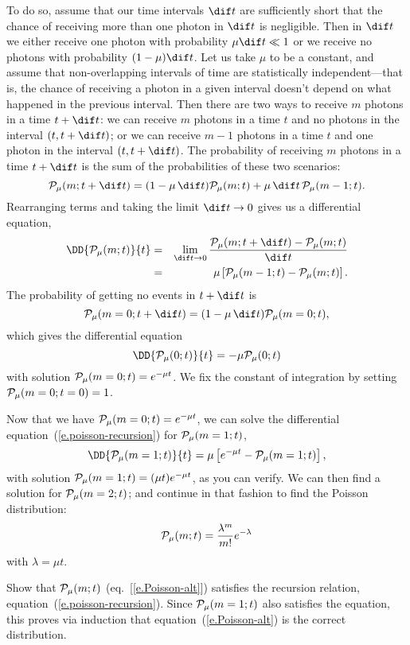 To do so, assume that our time intervals $\dif t$ are sufficiently short that the chance of receiving more than one photon in $\dif t$ is negligible.  Then in $\dif t$ we either receive one photon with probability $\mu\dif t \ll 1$ or we receive no photons with probability $(1-\mu)\dif t$.  Let us take $\mu$ to be a constant, and assume that non-overlapping intervals of time are statistically independent---that is, the chance of receiving a photon in a given interval doesn't depend on what happened in the previous interval. Then there are two ways to receive $m$ photons in a time $t+\dif t$: we can receive $m$ photons in a time $t$ and no photons in the interval $(t,t+\dif t)$; or we can receive $m-1$ photons in a time $t$ and one photon in the interval $(t,t+\dif t)$.  The probability of receiving $m$ photons in a time $t+\dif t$ is the sum of the probabilities of these two scenarios:
\[
	\prob_{\mu}(m;t+\dif t) = (1-\mu\,\dif t)\prob_{\mu}(m;t) + \mu\,\dif t\, \prob_{\mu}(m-1;t).
\]
Rearranging terms and taking the limit $\dif t \to 0$ gives us a differential equation,
\begin{eqnarray}
\DD{\prob_{\mu}(m;t)}{t} &=& \lim_{\dif t\to 0} \frac{\prob_{\mu}(m;t+\dif t)-\prob_{\mu}(m;t)}{\dif t} \nonumber\\
&=& \mu\left[\prob_{\mu}(m-1;t)-\prob_{\mu}(m;t)\right].
\label{e.poisson-recursion}
\end{eqnarray}
The probability of getting no events in $t+\dif t$ is
\[ \prob_{\mu}(m=0;t+\dif t) = (1-\mu\,\dif t)\prob_{\mu}(m=0;t), \]
which gives the differential equation
\[ \DD{\prob_{\mu}(0;t)}{t} = -\mu\prob_{\mu}(0;t) \]
with solution $\mathcal{P}_{\mu}(m=0;t) = e^{-\mu t}$.  We fix the constant of integration by setting $\mathcal{P}_{\mu}(m=0;t=0) = 1$.

Now that we have $\mathcal{P}_{\mu}(m=0;t) = e^{-\mu t}$, we can solve the differential equation~(\ref{e.poisson-recursion}) for $\mathcal{P}_{\mu}(m=1;t)$,
\[ \DD{\prob_{\mu}(m=1;t)}{t} = \mu\left[e^{-\mu t} - \prob_{\mu}(m=1;t)\right], \]
with solution $\mathcal{P}_{\mu}(m=1;t) = (\mu t)e^{-\mu t}$, as you can verify.  We can then find a solution for $\mathcal{P}_{\mu}(m=2;t)$; and continue in that fashion to find the Poisson distribution:
\begin{equation}\label{e.Poisson-alt}
	\mathcal{P}_{\mu}(m;t) = \frac{\lambda^{m}}{m!} e^{-\lambda}
\end{equation}
with $\lambda=\mu t$.

\begin{exercisebox}
Show that $\mathcal{P}_{\mu}(m;t)$ (eq.~[\ref{e.Poisson-alt}]) satisfies the recursion relation, equation~(\ref{e.poisson-recursion}). Since $\mathcal{P}_{\mu}(m=1;t)$ also satisfies the equation, this proves via induction that equation~(\ref{e.Poisson-alt}) is the correct distribution.
\end{exercisebox}

